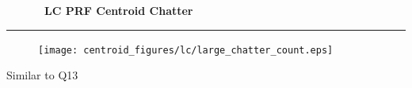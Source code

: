 
\cleardoublepage
\begin{figure}[h!]
  \centering
  \hfill
  {\Huge {\bf \quarter\ LC PRF Centroid Chatter}}
  \hfill
\end{figure}
\hrule

\begin{figure}[h!]
  \centering
  \texttt{[image: centroid\_figures/lc/large\_chatter\_count.eps]}
\end{figure}

Similar to Q13

